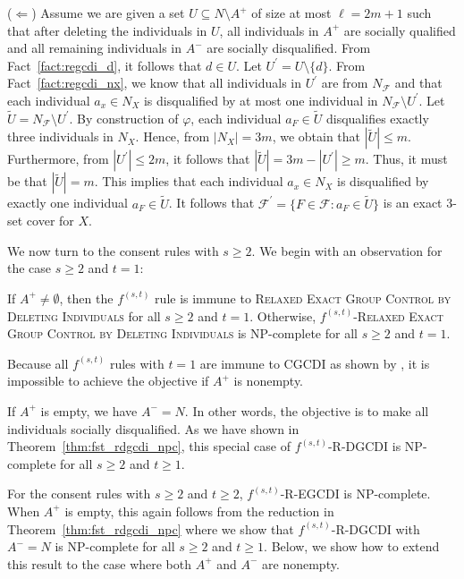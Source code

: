 \documentclass[
    12pt,               %
    a4paper,            %
    bibtotoc,           %
    pointlessnumbers,   %
    ngerman,            %
    titlepage,          %
    leqno,              %
    ]{scrarticle}       %
\newcommand\thmref{Theorem~\ref}
\newcommand\factref{Fact~\ref}
\begin{document}
\begin{Proof}
($\Leftarrow$) Assume we are given a set $U \subseteq N \setminus A^+$ of size at most $\ell = 2m+1$ such that after deleting the individuals in $U$, all individuals in $A^+$ are socially qualified and all remaining individuals in $A^-$ are socially disqualified. From \factref{fact:regcdi_d}, it follows that $d \in U$. Let $U^\prime = U \setminus \{d\}$. From \factref{fact:regcdi_nx}, we know that all individuals in $U^\prime$ are from $N_\mathcal{F}$ and that each individual $a_x \in N_X$ is disqualified by at most one individual in $N_\mathcal{F} \setminus U^\prime$. Let $\tilde{U} = N_\mathcal{F} \setminus U^\prime$. By construction of $\varphi$, each individual $a_F \in \tilde{U}$ disqualifies exactly three individuals in $N_X$. Hence, from $|N_X| = 3m$, we obtain that $|\tilde{U}| \leq m$. Furthermore, from $|U^\prime| \leq 2m$, it follows that $|\tilde{U}| = 3m - |U^\prime| \geq m$. Thus, it must be that $|\tilde{U}| = m$. This implies that each individual $a_x \in N_X$ is disqualified by exactly one individual $a_F \in \tilde{U}$. It follows that $\mathcal{F}^\prime = \{ F \in \mathcal{F} : a_F \in \tilde{U} \}$ is an exact 3-set cover for $X$.
\end{Proof}



We now turn to the consent rules with $s \geq 2$. We begin with an observation for the case $s \geq 2$ and $t=1$:

\begin{Observation} \label{obs:f21_regcdi_i_npc}
If $A^+ \neq \emptyset$, then the $f^{(s, t)}$ rule is immune to \textsc{Relaxed Exact Group Control by Deleting Individuals} for all $s \geq 2$ and $t=1$. Otherwise, $f^{(s, t)}$-\textsc{Relaxed Exact Group Control by Deleting Individuals} is NP-complete for all $s \geq 2$ and $t=1$.
\end{Observation}

\begin{Proof}
Because all $f^{(s, t)}$ rules with $t=1$ are immune to CGCDI as shown by \textcite[Theorem 2]{YD18}, it is impossible to achieve the objective if $A^+$ is nonempty.

If $A^+$ is empty, we have $A^- = N$. In other words, the objective is to make all individuals socially disqualified. As we have shown in \thmref{thm:fst_rdgcdi_npc}, this special case of $f^{(s, t)}$-R-DGCDI is NP-complete for all $s \geq 2$ and $t \geq 1$.
\end{Proof}



For the consent rules with $s \geq 2$ and $t \geq 2$, $f^{(s, t)}$-R-EGCDI is NP-complete. When $A^+$ is empty, this again follows from the reduction in \thmref{thm:fst_rdgcdi_npc} where we show that $f^{(s, t)}$-R-DGCDI with $A^- = N$ is NP-complete for all $s \geq 2$ and $t \geq 1$. Below, we show how to extend this result to the case where both $A^+$ and $A^-$ are nonempty.
\end{document}
